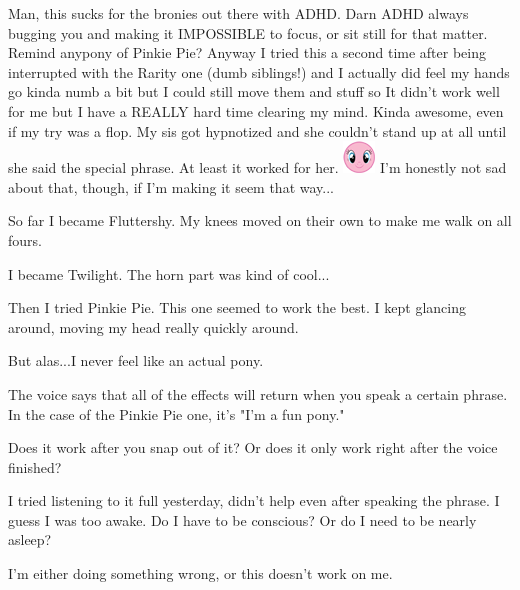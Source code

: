 \documentclass[ebook,12pt,oneside,openany]{memoir}
\begin{document}
\begin{tcolorbox}[title=Scarletthealicorn,colback=lime!5!white,colframe=lime!75!black,coltitle=white]
\par{Man, this sucks for the bronies out there with ADHD. Darn ADHD always bugging you and making it IMPOSSIBLE to focus, or sit still for that matter. Remind anypony of Pinkie Pie? Anyway I tried this a second time after being interrupted with the Rarity one (dumb siblings!) and I actually did feel my hands go kinda numb a bit but I could still move them and stuff so It didn't work well for me but I have a REALLY hard time clearing my mind.  Kinda awesome, even if my try was a flop.  My sis got hypnotized and she couldn't stand up at all until she said the special phrase. At least it worked for her. \includegraphics{images/mlp_smile.png} I'm honestly not sad about that, though, if I'm making it seem that way...}
\end{tcolorbox}
\begin{tcolorbox}[title=Feather Gem]
\par{So far I became Fluttershy.  My knees moved on their own to make me walk on all fours.}
\par{I became Twilight.  The horn part was kind of cool...}
\par{Then I tried Pinkie Pie.  This one seemed to work the best.  I kept glancing around, moving my head really quickly around.}
\newline{}
\par{But alas...I never feel like an actual pony.}
\end{tcolorbox}
\begin{tcolorbox}[title=suclearnub]
\begin{tcolorbox}[title=nerfman100]
\par{The voice says that all of the effects will return when you speak a certain phrase. In the case of the Pinkie Pie one, it's "I'm a fun pony."}
\end{tcolorbox}
\par{Does it work after you snap out of it? Or does it only work right after the voice finished?}
\par{I tried listening to it full yesterday, didn't help even after speaking the phrase. I guess I was too awake. Do I have to be conscious? Or do I need to be nearly asleep?}
\par{I'm either doing something wrong, or this doesn't work on me.}
\end{tcolorbox}
\end{document}
